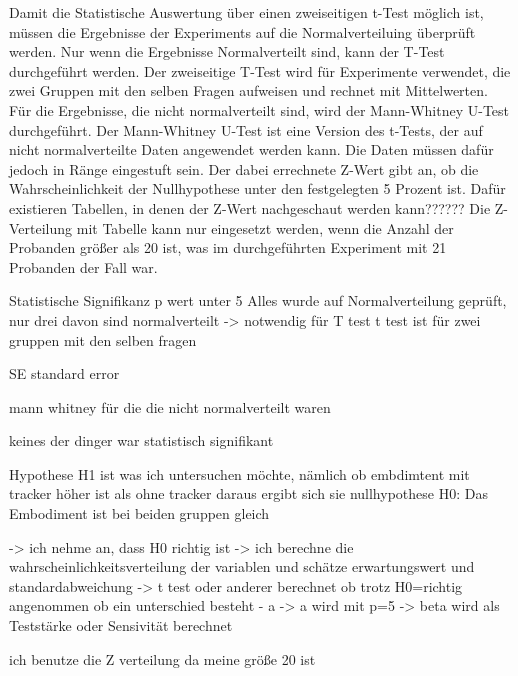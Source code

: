 Damit die Statistische Auswertung über einen zweiseitigen t-Test möglich ist, müssen die Ergebnisse der Experiments auf die Normalverteiluing überprüft werden. Nur wenn die Ergebnisse Normalverteilt sind, kann der T-Test durchgeführt werden. Der zweiseitige T-Test wird für Experimente verwendet, die zwei Gruppen mit den selben Fragen aufweisen und rechnet mit Mittelwerten. Für die Ergebnisse, die nicht normalverteilt sind, wird der Mann-Whitney U-Test durchgeführt. Der Mann-Whitney U-Test ist eine Version des t-Tests, der auf nicht normalverteilte Daten angewendet werden kann. Die Daten müssen dafür jedoch in Ränge eingestuft sein. Der dabei errechnete Z-Wert gibt an, ob die Wahrscheinlichkeit der Nullhypothese unter den festgelegten 5 Prozent ist. Dafür existieren Tabellen, in denen der Z-Wert nachgeschaut werden kann?????? Die Z-Verteilung mit Tabelle kann nur eingesetzt werden, wenn die Anzahl der Probanden größer als 20 ist, was im durchgeführten Experiment mit 21 Probanden der Fall war.



Statistische Signifikanz p wert unter 5%
Alles wurde auf Normalverteilung geprüft, nur drei davon sind normalverteilt -> notwendig für T test
t test ist für zwei gruppen mit den selben fragen


SE standard error

mann whitney für die die nicht normalverteilt waren

keines der dinger war statistisch signifikant


Hypothese H1 ist was ich untersuchen möchte, nämlich ob embdimtent mit tracker höher ist als ohne tracker
daraus ergibt sich sie nullhypothese H0: Das Embodiment ist bei beiden gruppen gleich

-> ich nehme an, dass H0 richtig ist
-> ich berechne die wahrscheinlichkeitsverteilung der variablen und schätze erwartungswert und standardabweichung
-> t test oder anderer berechnet ob trotz H0=richtig angenommen ob ein unterschied besteht - a
-> a wird mit p=5%
-> beta wird als Teststärke oder Sensivität berechnet

ich benutze die Z verteilung da meine größe 20 ist


